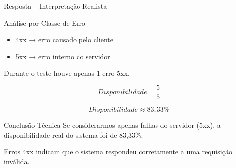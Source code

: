 \documentclass[9pt]{beamer}
\begin{document}
\begin{frame}{Resposta – Interpretação Realista}

\begin{block}{Análise por Classe de Erro}
\begin{itemize}
    \item 4xx → erro causado pelo cliente
    \item 5xx → erro interno do servidor
\end{itemize}
\end{block}

Durante o teste houve apenas 1 erro 5xx.

\[
Disponibilidade = \frac{5}{6}
\]

\[
Disponibilidade \approx 83,33\%
\]

\begin{block}{Conclusão Técnica}
Se considerarmos apenas falhas do servidor (5xx),
a disponibilidade real do sistema foi de 83,33\%.

Erros 4xx indicam que o sistema respondeu corretamente
a uma requisição inválida.
\end{block}

\end{frame}
\end{document}
